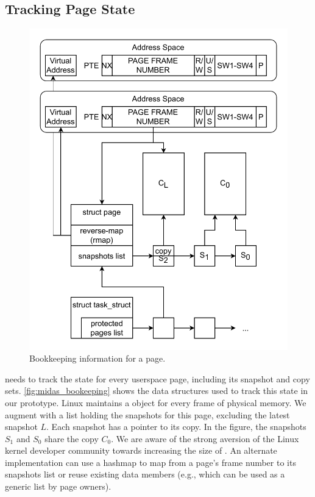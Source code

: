\documentclass[letterpaper,twocolumn,10pt]{article}
\begin{document}
\subsection{Tracking Page State}

\begin{figure}[]
  \centering
  \includegraphics[width=\linewidth]{img/book-keeping.pdf}
  \caption{Bookkeeping information for a page.}
  \label{fig:midas_bookeeping}
\end{figure}

\midas needs to track the state for every userspace page, including
its snapshot and copy sets.
\autoref{fig:midas_bookeeping} shows the data structures used to
track this state in our prototype.
Linux maintains a  object for every frame of 
physical memory. 
We augment   with a list holding the snapshots
for this page, excluding the latest snapshot $L$.
Each snapshot has a pointer to its copy. 
In the figure, the snapshots $S_1$ and $S_0$ share the copy $C_0$.
We are aware of the strong aversion of the 
Linux kernel developer community towards increasing the size of 
. 
An alternate implementation can use a hashmap to
map from a page's frame number to its snapshots list or
reuse existing data members (e.g.,  which 
can be used as a generic list by page owners).
\end{document}
